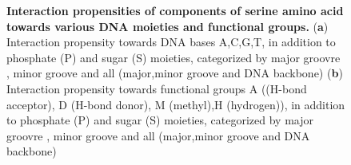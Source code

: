 \begin{center}
    \begin{figure}[H]
        \caption[Interaction propensities of components of serine amino acid towards various DNA moieties and functional groups]{\textbf{ Interaction propensities of components of serine amino acid towards various DNA moieties and functional groups.} ({\bf a}) Interaction  propensity towards DNA bases  A,C,G,T, in addition to phosphate (P) and sugar (S) moieties, categorized by major groovre , minor groove and all (major,minor groove and DNA backbone) ({\bf b}) Interaction  propensity towards functional groups \citep{Chiu2023} A ((H-bond acceptor), D (H-bond donor), M (methyl),H (hydrogen)), in addition to phosphate (P) and sugar (S) moieties, categorized by major groovre , minor groove and all (major,minor groove and DNA backbone)}
  \label{fig:ser}
\end{figure}
\end{center}

